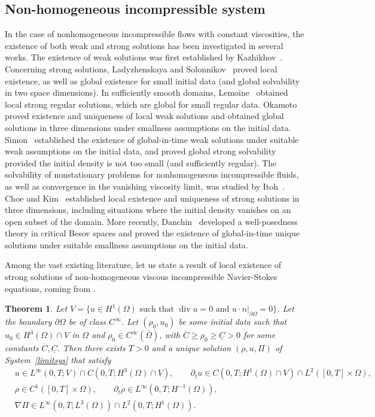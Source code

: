 \documentclass[11pt, twoside, a4paper]{article}
\theoremstyle{plain}
\newtheorem{theorem}{Theorem}[section]
\theoremstyle{remark}
\numberwithin{equation}{section}
\renewcommand{\div}{\operatorname{div}}
\renewcommand{\geq}{\geqslant}\renewcommand{\ge}{\geqslant}
\newcommand{\dt}{\partial_t}
\begin{document}
\subsection{Non-homogeneous incompressible system}\label{sec.incomp}


In the case of nonhomogeneous incompressible flows with constant viscosities, the existence of both weak and strong solutions has been investigated in several works. The existence of weak solutions was first established by Kazhikhov~\cite{kazhikov}. Concerning strong solutions, Ladyzhenskaya and Solonnikov~\cite{ladyzhenskaya1978unique} proved local existence, as well as global existence for small initial data (and global solvability in two space dimensions). In sufficiently smooth domains, Lemoine~\cite{lemoine1997non} obtained local strong regular solutions, which are global for small regular data. Okamoto~\cite{okamoto1984equation} proved existence and uniqueness of local weak solutions and obtained global solutions in three dimensions under smallness assumptions on the initial data. Simon~\cite{simon1990nonhomogeneous} established the existence of global-in-time weak solutions under suitable weak assumptions on the initial data, and proved global strong solvability provided the initial density is not too small (and sufficiently regular). The solvability of nonstationary problems for nonhomogeneous incompressible fluids, as well as convergence in the vanishing viscosity limit, was studied by Itoh~\cite{itoh1999solvability}. Choe and Kim~\cite{jun2003strong} established local existence and uniqueness of strong solutions in three dimensions, including situations where the initial density vanishes on an open subset of the domain. More recently, Danchin~\cite{danchin2012lagrangian} developed a well-posedness theory in critical Besov spaces and proved the existence of global-in-time unique solutions under suitable smallness assumptions on the initial data.


Among the vast existing literature, let us state a result of local existence of strong solutions of non-homogeneous viscous incompressible Navier-Stokes equations, coming from \cite{salvi1991equations}.


\begin{theorem}\label{sol-lim}
 Let $V = \{u \in H^1(\Omega) \text{ such that } \div u =0\text{ and }u\cdot n|_{\partial \Omega}=0\}$. Let the boundary $\partial \Omega$ be of class $C^\infty$.
 Let $(\rho_0, u_0) $ be some initial data such that $u_0 \in H^3(\Omega) \cap V$ in $\Omega$ and $\rho_0 \in C^\infty(\bar{\Omega})$, with $\overline{C} \geq \rho_0 \geq \underline{C}>0$ for some constants $\overline{C}, \underline{C}$.
 Then there exists $T>0$ and a unique solution $(\rho,u, \Pi)$ of System~\eqref{limitsys} that satisfy
 \begin{align*}
 &u \in L^\infty(0,T;V) \cap C(0,T;H^3(\Omega)\cap V), \qquad \dt u \in C(0,T;H^1(\Omega)\cap V) \cap L^2([0,T]\times \Omega),\\
 &\rho \in C^1([0,T]\times \Omega), \qquad \dt \rho \in L^\infty(0,T;H^{-1}(\Omega)),\\
 &\nabla \Pi \in L^\infty(0,T;L^3(\Omega))\cap L^2(0,T;H^1(\Omega)).
 \end{align*}
\end{theorem}
\end{document}
